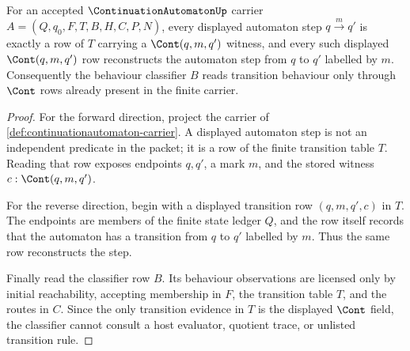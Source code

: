 \begin{theorem}\label{thm:continuationautomaton-step-continuation-correspondence}
For an accepted $\ContinuationAutomatonUp$ carrier $A=(Q,q_0,F,T,B,H,C,P,N)$, every displayed automaton step $q \xrightarrow{m} q'$ is exactly a row of $T$ carrying a $\Cont(q,m,q')$ witness, and every such displayed $\Cont(q,m,q')$ row reconstructs the automaton step from $q$ to $q'$ labelled by $m$. Consequently the behaviour classifier $B$ reads transition behaviour only through $\Cont$ rows already present in the finite carrier.
\end{theorem}
\begin{proof}
For the forward direction, project the carrier of \autoref{def:continuationautomaton-carrier}. A displayed automaton step is not an independent predicate in the packet; it is a row of the finite transition table $T$. Reading that row exposes endpoints $q,q'$, a mark $m$, and the stored witness $c:\Cont(q,m,q')$.

For the reverse direction, begin with a displayed transition row $(q,m,q',c)$ in $T$. The endpoints are members of the finite state ledger $Q$, and the row itself records that the automaton has a transition from $q$ to $q'$ labelled by $m$. Thus the same row reconstructs the step.

Finally read the classifier row $B$. Its behaviour observations are licensed only by initial reachability, accepting membership in $F$, the transition table $T$, and the routes in $C$. Since the only transition evidence in $T$ is the displayed $\Cont$ field, the classifier cannot consult a host evaluator, quotient trace, or unlisted transition rule.
\end{proof}

